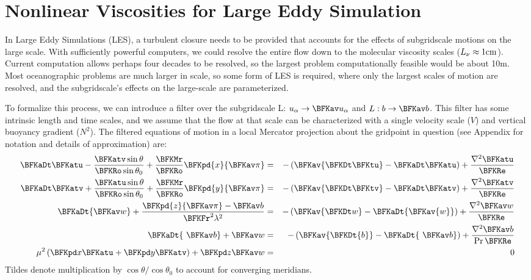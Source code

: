 
\section{Nonlinear Viscosities for Large Eddy Simulation}
\label{sect:nonlin-visc}

In Large Eddy Simulations (LES), a turbulent closure needs to be
provided that accounts for the effects of subgridscale motions on the
large scale.  With sufficiently powerful computers, we could resolve
the entire flow down to the molecular viscosity scales
{($L_{\nu}\approx 1 \rm cm$)}.  Current computation allows perhaps
four decades to be resolved, so the largest problem computationally
feasible would be about 10m. Most oceanographic problems are much
larger in scale, so some form of LES is required, where only the
largest scales of motion are resolved, and the subgridscale's effects
on the large-scale are parameterized.

To formalize this process, we can introduce a filter over the
subgridscale L: $u_\alpha\rightarrow \BFKav u_\alpha$ and $L:
b\rightarrow \BFKav b$.  This filter has some intrinsic length and time
scales, and we assume that the flow at that scale can be characterized
with a single velocity scale ($V$) and vertical buoyancy gradient
($N^2$). The filtered equations of motion in a local Mercator
projection about the gridpoint in question (see Appendix for notation
and details of approximation) are: 
\begin{eqnarray}
\BFKaDt \BFKatu- \frac{\BFKatv
  \sin\theta}{\BFKRo\sin\theta_0}+\frac{\BFKMr}{\BFKRo}\BFKpd{x}{\BFKav\pi}
& = & -\left({\BFKav{\BFKDt \BFKtu}}-{\BFKaDt \BFKatu}\right)
+\frac{\nabla^2{\BFKatu}}{\BFKRe}\label{eq:mercat}\\
\BFKaDt\BFKatv+\frac{\BFKatu\sin\theta}{\BFKRo\sin\theta_0}
+\frac{\BFKMr}{\BFKRo}\BFKpd{y}{\BFKav\pi}
& = & -\left({\BFKav{\BFKDt \BFKtv}}-{\BFKaDt \BFKatv}\right)
+\frac{\nabla^2{\BFKatv}}{\BFKRe}\nonumber\\
\BFKaDt {\BFKav w} +\frac{\BFKpd{z}{\BFKav\pi}-\BFKav b}{\BFKFr^2\lambda^2}
& = & -\left(\BFKav{\BFKDt w}-\BFKaDt {\BFKav{w}}\right)
+\frac{\nabla^2\BFKav w}{\BFKRe}\nonumber\\
\BFKaDt{\ \BFKav b}+\BFKav w & = &
 -\left(\BFKav{\BFKDt{b}}-\BFKaDt{\ \BFKav b} \right)
+\frac{\nabla^2 \BFKav b}{\Pr\BFKRe}\nonumber \\
\mu^2\left(\BFKpd x\BFKatu  + \BFKpd y\BFKatv \right)+\BFKpd z {\BFKav w} 
& = & 0\label{eq:cont}
\end{eqnarray}
Tildes denote multiplication by $\cos\theta/\cos\theta_0$ to account
for converging meridians.

